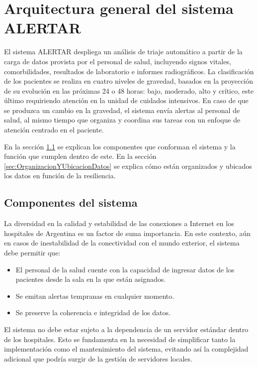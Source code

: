 \chapter{Arquitectura general del sistema ALERTAR}\label{cap:arquitecturaGeneral}

El sistema ALERTAR despliega un análisis de triaje automático a partir de la carga de datos provista por el personal de salud, incluyendo signos vitales, comorbilidades, resultados de laboratorio e informes radiográficos. La clasificación de los pacientes se realiza en cuatro niveles de gravedad, basados en la proyección de su evolución en las próximas 24 o 48 horas: bajo, moderado, alto y crítico, este último requiriendo atención en la unidad de cuidados intensivos. En caso de que se produzca un cambio en la gravedad, el sistema envía alertas al personal de salud, al mismo tiempo que organiza y coordina sus tareas con un enfoque de atención centrado en el paciente.

En la sección \ref{sec:componentesSistema} se explican los componentes que conforman el sistema y la función que cumplen dentro de este. En la sección \ref{sec:OrganizacionYUbicacionDatos} se explica cómo están organizados y ubicados los datos en función de la resiliencia.
\section{Componentes del sistema}
\label{sec:componentesSistema}
La diversidad en la calidad y estabilidad de las conexiones a Internet en los hospitales de Argentina es un factor de suma importancia. En este contexto, aún en casos de inestabilidad de la conectividad con el mundo exterior, el sistema debe permitir que:
\begin{itemize}
    \item El personal de la salud cuente con la capacidad de ingresar datos de los pacientes desde la sala en la que están asignados.
    \item Se emitan alertas tempranas en cualquier momento.
    \item Se preserve la coherencia e integridad de los datos.
\end{itemize}

El sistema no debe estar sujeto a la dependencia de un servidor estándar dentro de los hospitales. Esto se fundamenta en la necesidad de simplificar tanto la implementación como el mantenimiento del sistema, evitando así la complejidad adicional que podría surgir de la gestión de servidores locales.

